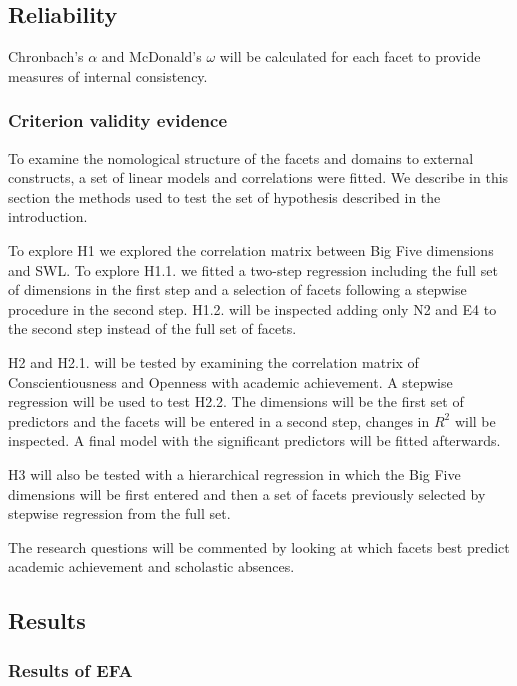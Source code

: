 \documentclass[,man,floatsintext]{apa6}
\begin{document}
\subsection{Reliability}\label{reliability}

Chronbach's \(\alpha\) and McDonald's \(\omega\) will be calculated for
each facet to provide measures of internal consistency.

\subsubsection{Criterion validity
evidence}\label{criterion-validity-evidence}

To examine the nomological structure of the facets and domains to
external constructs, a set of linear models and correlations were
fitted. We describe in this section the methods used to test the set of
hypothesis described in the introduction.

To explore H1 we explored the correlation matrix between Big Five
dimensions and SWL. To explore H1.1. we fitted a two-step regression
including the full set of dimensions in the first step and a selection
of facets following a stepwise procedure in the second step. H1.2. will
be inspected adding only N2 and E4 to the second step instead of the
full set of facets.

H2 and H2.1. will be tested by examining the correlation matrix of
Conscientiousness and Openness with academic achievement. A stepwise
regression will be used to test H2.2. The dimensions will be the first
set of predictors and the facets will be entered in a second step,
changes in \(R^2\) will be inspected. A final model with the significant
predictors will be fitted afterwards.

H3 will also be tested with a hierarchical regression in which the Big
Five dimensions will be first entered and then a set of facets
previously selected by stepwise regression from the full set.

The research questions will be commented by looking at which facets best
predict academic achievement and scholastic absences.

\subsection{Results}\label{results}

\subsubsection{Results of EFA}\label{results-of-efa}
\end{document}

